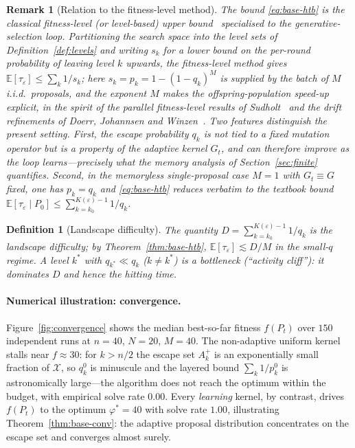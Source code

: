 \documentclass[11pt,a4paper]{article}
\newtheorem{definition}[theorem]{Definition}
\newtheorem{remark}[theorem]{Remark}
\newcommand{\X}{\mathcal{X}}
\newcommand{\E}{\mathbb{E}}
\newcommand{\phist}{\varphi^*}
\newcommand{\Akp}{A_k^{+}}
\begin{document}
\begin{remark}[Relation to the fitness-level method]\label{rem:fitness-level}
  The bound \eqref{eq:base-htb} is the classical fitness-level (or
  level-based) upper bound~\cite{Wegener2001,Jansen2013} specialised to the
  generative-selection loop.  Partitioning the search space into the level
  sets of Definition~\ref{def:levels} and writing $s_k$ for a lower bound on
  the per-round probability of leaving level $k$ upwards, the fitness-level
  method gives $\E[\tau_\varepsilon]\le\sum_k 1/s_k$; here
  $s_k=p_k=1-(1-q_k)^M$ is supplied by the batch of $M$ i.i.d.\ proposals,
  and the exponent $M$ makes the offspring-population speed-up explicit, in
  the spirit of the parallel fitness-level results of
  Sudholt~\cite{Sudholt2013} and the drift refinements of Doerr, Johannsen
  and Winzen~\cite{Doerr2012}.  Two features distinguish the present setting.
  First, the escape probability $q_k$ is not tied to a fixed mutation
  operator but is a property of the \emph{adaptive} kernel $G_t$, and can
  therefore \emph{improve} as the loop learns---precisely what the memory
  analysis of Section~\ref{sec:finite} quantifies.  Second, in the
  memoryless single-proposal case $M=1$ with $G_t\equiv G$ fixed, one has
  $p_k=q_k$ and \eqref{eq:base-htb} reduces verbatim to the textbook bound
  $\E[\tau_\varepsilon\mid P_0]\le\sum_{k=k_0}^{K(\varepsilon)-1} 1/q_k$.
\end{remark}

\begin{definition}[Landscape difficulty]\label{def:difficulty}
  The quantity $D=\sum_{k=k_0}^{K(\varepsilon)-1}1/q_k$ is the \emph{landscape
  difficulty}; by Theorem~\ref{thm:base-htb},
  $\E[\tau_\varepsilon]\lesssim D/M$ in the small-$q$ regime.  A level
  $k^*$ with $q_{k^*}\ll q_k$ ($k\ne k^*$) is a \emph{bottleneck}
  (``activity cliff''): it dominates $D$ and hence the hitting time.
\end{definition}

\paragraph{Numerical illustration: convergence.}

Figure~\ref{fig:convergence} shows the median best-so-far fitness $f(P_t)$ over
$150$ independent runs at $n=40$, $N=20$, $M=40$.  The non-adaptive
uniform kernel stalls near $f\approx30$: for $k>n/2$ the escape set
$\Akp$ is an exponentially small fraction of $\X$, so $q_k^0$ is
minuscule and the layered bound $\sum_k 1/p_k^0$ is astronomically
large---the algorithm does not reach the optimum within the budget, with
empirical solve rate $0.00$.  Every \emph{learning} kernel, by contrast,
drives $f(P_t)$ to the optimum $\phist=40$ with solve rate $1.00$,
illustrating Theorem~\ref{thm:base-conv}: the adaptive proposal distribution
concentrates on the escape set and converges almost surely.
\end{document}

